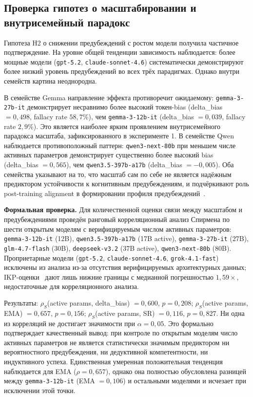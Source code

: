 \subsection{Проверка гипотез о масштабировании и внутрисемейный парадокс}

Гипотеза H2 о снижении предубеждений с ростом модели получила частичное подтверждение. На уровне общей тенденции зависимость наблюдается: более мощные модели (\texttt{gpt-5.2}, \texttt{claude-sonnet-4.6}) систематически демонстрируют более низкий уровень предубеждений во всех трёх парадигмах. Однако внутри семейств картина неоднородна.

В семействе Gemma направление эффекта противоречит ожидаемому: \texttt{gemma-3-27b-it} демонстрирует несравнимо более высокий токен-bias (delta\_bias $= 0{,}498$, fallacy rate $58{,}7\%$), чем \texttt{gemma-3-12b-it} (delta\_bias $= 0{,}039$, fallacy rate $2{,}9\%$). Это является наиболее ярким проявлением внутрисемейного парадокса масштаба, зафиксированного в эксперименте 1. В семействе Qwen наблюдается противоположный паттерн: \texttt{qwen3-next-80b} при меньшем числе активных параметров демонстрирует существенно более высокий bias (delta\_bias $= 0{,}565$), чем \texttt{qwen3.5-397b-a17b} (delta\_bias $= -0{,}005$). Оба семейства указывают на то, что масштаб сам по себе не является надёжным предиктором устойчивости к когнитивным предубеждениям, и подчёркивают роль post-training alignment в формировании профиля предубеждений~\cite{batista2026rational}.

\textbf{Формальная проверка.} Для количественной оценки связи между масштабом и предубеждениями проведён ранговый корреляционный анализ Спирмена по шести открытым моделям с верифицируемым числом активных параметров: \texttt{gemma-3-12b-it} (12B), \texttt{qwen3.5-397b-a17b} (17B active), \texttt{gemma-3-27b-it} (27B), \texttt{glm-4.7-flash} (30B), \texttt{deepseek-v3.2} (37B active), \texttt{qwen3-next-80b} (80B). Проприетарные модели (\texttt{gpt-5.2}, \texttt{claude-sonnet-4.6}, \texttt{grok-4.1-fast}) исключены из анализа из-за отсутствия верифицируемых архитектурных данных; IKP-оценки~\cite{li2026ikp} дают лишь нижние границы с медианной погрешностью $1{,}59\times$, недостаточные для корреляционного анализа.

Результаты: $\rho_S$(active params, delta\_bias) $= 0{,}600$, $p = 0{,}208$; $\rho_S$(active params, EMA) $= 0{,}657$, $p = 0{,}156$; $\rho_S$(active params, SR) $= 0{,}116$, $p = 0{,}827$. Ни одна из корреляций не достигает значимости при $\alpha = 0{,}05$. Это формально подтверждает качественный вывод: при контроле по открытым моделям число активных параметров не является статистически значимым предиктором ни вероятностного предубеждения, ни дедуктивной компетентности, ни индуктивного успеха. Единственная умеренная положительная тенденция наблюдается для EMA ($\rho = 0{,}657$), однако она полностью обусловлена разницей между \texttt{gemma-3-12b-it} (EMA $= 0{,}106$) и остальными моделями и исчезает при исключении этой точки.

